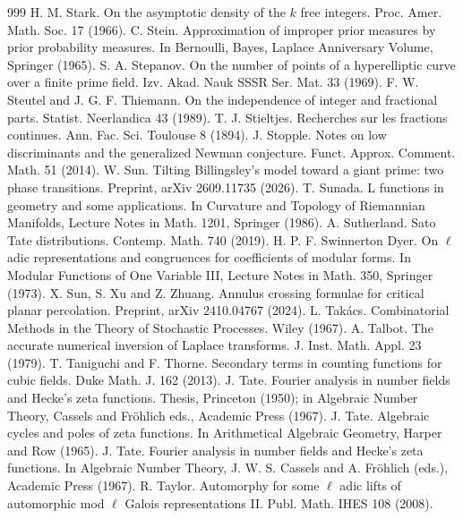 \begin{thebibliography}{999}
 H. M. Stark. On the asymptotic density of the $k$ free integers. Proc. Amer. Math. Soc. 17 (1966).
 C. Stein. Approximation of improper prior measures by prior probability measures. In Bernoulli, Bayes, Laplace Anniversary Volume, Springer (1965).
 S. A. Stepanov. On the number of points of a hyperelliptic curve over a finite prime field. Izv. Akad. Nauk SSSR Ser. Mat. 33 (1969).
 F. W. Steutel and J. G. F. Thiemann. On the independence of integer and fractional parts. Statist. Neerlandica 43 (1989).
 T. J. Stieltjes. Recherches sur les fractions continues. Ann. Fac. Sci. Toulouse 8 (1894).
 J. Stopple. Notes on low discriminants and the generalized Newman conjecture. Funct. Approx. Comment. Math. 51 (2014).
 W. Sun. Tilting Billingsley's model toward a giant prime: two phase transitions. Preprint, arXiv 2609.11735 (2026).
 T. Sunada. L functions in geometry and some applications. In Curvature and Topology of Riemannian Manifolds, Lecture Notes in Math. 1201, Springer (1986).
 A. Sutherland. Sato Tate distributions. Contemp. Math. 740 (2019).
 H. P. F. Swinnerton Dyer. On $\ell$ adic representations and congruences for coefficients of modular forms. In Modular Functions of One Variable III, Lecture Notes in Math. 350, Springer (1973).
 X. Sun, S. Xu and Z. Zhuang. Annulus crossing formulae for critical planar percolation. Preprint, arXiv 2410.04767 (2024).
 L. Tak\'acs. Combinatorial Methods in the Theory of Stochastic Processes. Wiley (1967).
 A. Talbot. The accurate numerical inversion of Laplace transforms. J. Inst. Math. Appl. 23 (1979).
 T. Taniguchi and F. Thorne. Secondary terms in counting functions for cubic fields. Duke Math. J. 162 (2013).
 J. Tate. Fourier analysis in number fields and Hecke's zeta functions. Thesis, Princeton (1950); in Algebraic Number Theory, Cassels and Fr\"ohlich eds., Academic Press (1967).
 J. Tate. Algebraic cycles and poles of zeta functions. In Arithmetical Algebraic Geometry, Harper and Row (1965).
 J. Tate. Fourier analysis in number fields and Hecke's zeta functions. In Algebraic Number Theory, J. W. S. Cassels and A. Fr\"ohlich (eds.), Academic Press (1967).
 R. Taylor. Automorphy for some $\ell$ adic lifts of automorphic mod $\ell$ Galois representations II. Publ. Math. IHES 108 (2008).

\end{thebibliography}
